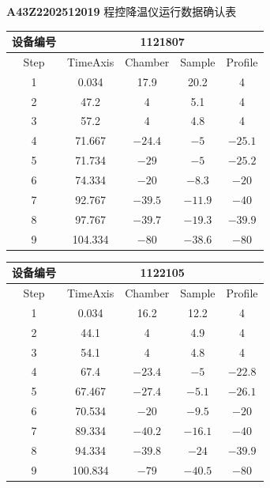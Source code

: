 \documentclass[UTF8,10pt,a4paper,fontset=fandol]{ctexart}
\begin{document}
\begin{center}
\textbf{A43Z2202512019} 程控降温仪运行数据确认表

\vspace{0.8em}

\small
\begin{tabular}{|c|c|c|c|c|}
\hline
\multicolumn{1}{|c|}{设备编号} & \multicolumn{4}{c|}{1121807} \\
\hline
Step & TimeAxis & Chamber & Sample & Profile \\
\hline
1 & 0.034 & 17.9 & 20.2 & 4 \\
\hline
2 & 47.2 & 4 & 5.1 & 4 \\
\hline
3 & 57.2 & 4 & 4.8 & 4 \\
\hline
4 & 71.667 & $-24.4$ & $-5$ & $-25.1$ \\
\hline
5 & 71.734 & $-29$ & $-5$ & $-25.2$ \\
\hline
6 & 74.334 & $-20$ & $-8.3$ & $-20$ \\
\hline
7 & 92.767 & $-39.5$ & $-11.9$ & $-40$ \\
\hline
8 & 97.767 & $-39.7$ & $-19.3$ & $-39.9$ \\
\hline
9 & 104.334 & $-80$ & $-38.6$ & $-80$ \\
\hline
\end{tabular}

\vspace{1.2em}

\begin{tabular}{|c|c|c|c|c|}
\hline
\multicolumn{1}{|c|}{设备编号} & \multicolumn{4}{c|}{1122105} \\
\hline
Step & TimeAxis & Chamber & Sample & Profile \\
\hline
1 & 0.034 & 16.2 & 12.2 & 4 \\
\hline
2 & 44.1 & 4 & 4.9 & 4 \\
\hline
3 & 54.1 & 4 & 4.8 & 4 \\
\hline
4 & 67.4 & $-23.4$ & $-5$ & $-22.8$ \\
\hline
5 & 67.467 & $-27.4$ & $-5.1$ & $-26.1$ \\
\hline
6 & 70.534 & $-20$ & $-9.5$ & $-20$ \\
\hline
7 & 89.334 & $-40.2$ & $-16.1$ & $-40$ \\
\hline
8 & 94.334 & $-39.8$ & $-24$ & $-39.9$ \\
\hline
9 & 100.834 & $-79$ & $-40.5$ & $-80$ \\
\hline
\end{tabular}
\end{center}
\end{document}
